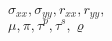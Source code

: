 \documentclass[12pt]{article}
\begin{document}
\noindent 
{\bf 
$\sigma_{xx}, \sigma_{yy}, r_{xx}, r_{yy},$\\
$ \mu, \pi, \tau^p, \tau^s, \varrho$
}
\end{document}
